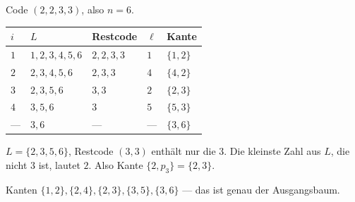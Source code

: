 \begin{merksatz}
Code $(2,2,3,3)$, also $n = 6$.

\begin{center}
{\small
\renewcommand{\arraystretch}{1.4}
\begin{tabular}{@{}P{0.8cm}P{2.4cm}P{2.0cm}P{1.4cm}P{1.4cm}@{}}
\toprule
$i$ & $L$ & \textbf{Restcode} & $\ell$ & \textbf{Kante}\\
\midrule
$1$ & $1,2,3,4,5,6$ & $2,2,3,3$ & $1$ & $\{1,2\}$\\
$2$ & $2,3,4,5,6$ & $2,3,3$ & $4$ & $\{4,2\}$\\
$3$ & $2,3,5,6$ & $3,3$ & $2$ & $\{2,3\}$\\
$4$ & $3,5,6$ & $3$ & $5$ & $\{5,3\}$\\
\midrule
--- & $3,6$ & --- & --- & $\{3,6\}$\\
\bottomrule
\end{tabular}}
\end{center}

$L = \{2,3,5,6\}$, Restcode $(3,3)$ enthält nur die $3$. Die kleinste Zahl aus $L$, die nicht $3$ ist, lautet $2$. Also Kante $\{2, p_3\} = \{2,3\}$.

Kanten $\{1,2\}, \{2,4\}, \{2,3\}, \{3,5\}, \{3,6\}$ --- das ist genau der Ausgangsbaum. \checkmark
\end{merksatz}


